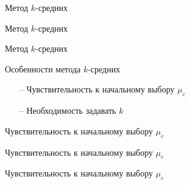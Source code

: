 \documentclass[10pt]{beamer}
\begin{document}
\begin{frame}{Метод $k$-средних}
\end{frame}

\begin{frame}{Метод $k$-средних}
\end{frame}

\begin{frame}{Метод $k$-средних}
\end{frame}

\begin{frame}{Особенности метода $k$-средних}
	\begin{itemize}
		\item[--] Чувствительность к начальному выбору $\mu_c$
		\item[--] Необходимость задавать $k$
	\end{itemize}
\end{frame}

\begin{frame}{Чувствительность к начальному выбору $\mu_c$}
\end{frame}

\begin{frame}{Чувствительность к начальному выбору $\mu_c$}
\end{frame}

\begin{frame}{Чувствительность к начальному выбору $\mu_c$}
\end{frame}
\end{document}
